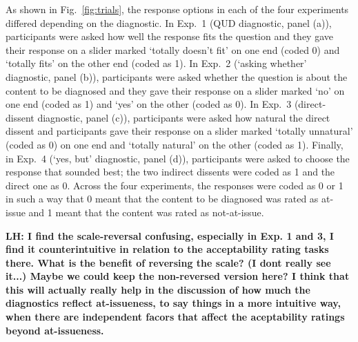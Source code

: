 \documentclass[times,linguex,xcolor]{glossa}
\newcommand{\lh}[1]{\textbf{\color{Cerulean}LH: #1}}
\begin{document}
  As shown in Fig.~\ref{fig:trials}, the response options in each of the four experiments differed depending on the diagnostic. In Exp.~1 (QUD diagnostic, panel (a)), participants were asked how well the response fits the question and they gave their response on a slider marked `totally doesn't fit' on one end (coded 0) and `totally fits' on the other end (coded as 1). In Exp.~2 (`asking whether' diagnostic, panel (b)), participants were asked whether the question is about the content to be diagnosed and they gave their response on a slider marked `no' on one end (coded as 1) and `yes' on the other (coded as 0). In Exp.~3 (direct-dissent diagnostic, panel (c)), participants were asked how natural the direct dissent and participants gave their response on a slider marked `totally unnatural' (coded as 0) on one end and `totally natural' on the other (coded as 1). Finally, in Exp.~4 (`yes, but' diagnostic, panel (d)), participants were asked to choose the response that sounded best; the two indirect dissents were coded as 1 and the direct one as 0. Across the four experiments, the responses were coded as 0 or 1 in such a way that 0 meant that the content to be diagnosed was rated as at-issue and 1 meant that the content was rated as not-at-issue.

  \lh{I find the scale-reversal confusing, especially in Exp. 1 and 3, I find it counterintuitive in relation to the acceptability rating tasks there. What is the benefit of reversing the scale? (I dont really see it...) Maybe we could keep the non-reversed version here? I think that this will actually really help in the discussion of how much the diagnostics reflect at-issueness, to say things in a more intuitive way, when there are independent facors that affect the aceptability ratings beyond at-issueness.}
\end{document}
